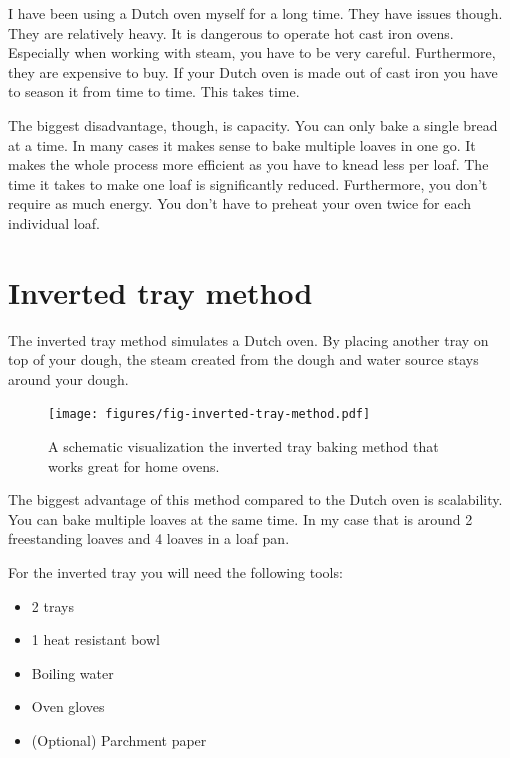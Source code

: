 I have been using a Dutch oven myself for a long time. They
have issues though. They are relatively heavy. It is dangerous
to operate hot cast iron ovens. Especially when working with steam,
you have to be very careful. Furthermore,
they are expensive to buy. If your Dutch oven is made out
of cast iron you have to season it from time to time. This takes
time.

The biggest disadvantage, though, is
capacity. You can only bake a single bread at a time.
In many cases it makes sense to bake multiple
loaves in one go. It makes the whole process more
efficient as you have to knead less per loaf. The time it
takes to make one loaf is significantly reduced. Furthermore,
you don't require as much energy. You don't have
to preheat your oven twice for each individual loaf.


\section{Inverted tray method}

The inverted tray method simulates a Dutch oven.
By placing another tray on top of your dough, the steam
created from the dough and water source stays
around your dough.

\begin{figure}[!htb]
  \texttt{[image: figures/fig-inverted-tray-method.pdf]}
  \caption{A schematic visualization the inverted tray baking method that works great for home ovens.}
  \label{fig:inverted-tray-process}
\end{figure}


The biggest advantage of this method compared to the
Dutch oven is scalability. You can bake multiple loaves
at the same time. In my case that is around 2 freestanding
loaves and 4 loaves in a loaf pan.

For the inverted tray you will need the following tools:
\begin{itemize}
\item 2 trays
\item 1 heat resistant bowl
\item Boiling water
\item Oven gloves
\item (Optional) Parchment paper
\end{itemize}

